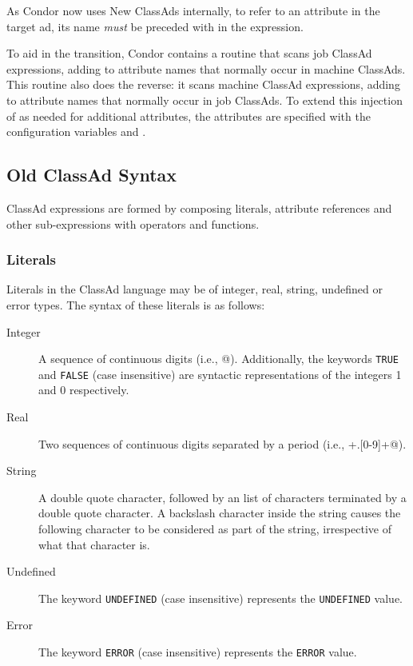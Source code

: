 As Condor now uses New ClassAds internally,
to refer to an attribute in the target ad,
its name \emph{must} be preceded with  in the expression.

To aid in the transition,
Condor contains a routine that scans job ClassAd expressions,
adding  to attribute names that normally occur
in machine ClassAds.
This routine also does the reverse:
it scans machine ClassAd expressions,
adding  to attribute names that normally occur
in job ClassAds.
To extend this injection of  as needed for additional attributes,
the attributes are specified with the configuration variables
 and .

\subsection{Old ClassAd Syntax}
ClassAd expressions are formed by composing literals, attribute references and 
other sub-expressions with operators and functions. 
\subsubsection{Literals}
\label{ClassAd:literals}
Literals in the ClassAd language may be of integer, real, string, undefined or 
error types.  The syntax of these literals is as follows:
\begin{description}
	\item[Integer]  A sequence of continuous digits (i.e., \verb@[0-9]@).
		Additionally, the keywords \verb+TRUE+ and \verb+FALSE+ (case
		insensitive) are syntactic representations of the integers 1 and 0 
		respectively.

	\item[Real] Two sequences of continuous digits separated by a period
		(i.e., \verb@[0-9]+.[0-9]+@).

	\item[String] A double quote character, followed by an list of characters
		terminated by a double quote character.  A backslash character inside
		the string causes the following character to be considered as part of
		the string, irrespective of what that character is.

	\item[Undefined] The keyword \texttt{UNDEFINED} (case insensitive)
		represents the \texttt{UNDEFINED} value.

	\item[Error] The keyword \texttt{ERROR} (case insensitive)
		represents the \texttt{ERROR} value.
\end{description}

